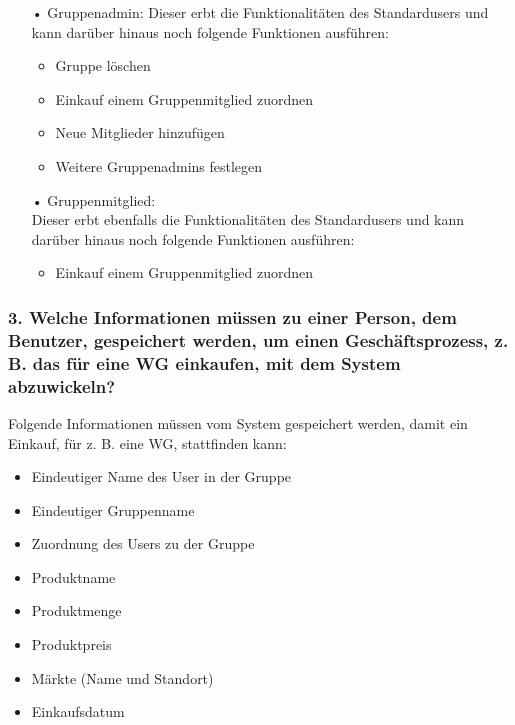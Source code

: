 \documentclass[12pt,a4paper]{article}
\begin{document}
\begin{itemize}
\item[•]Gruppenadmin:
\newline
Dieser erbt die Funktionalitäten des Standardusers und kann darüber hinaus noch folgende Funktionen ausführen:
\begin{itemize}
\item Gruppe löschen
\item Einkauf einem Gruppenmitglied zuordnen
\item Neue Mitglieder hinzufügen
\item Weitere Gruppenadmins festlegen
\end{itemize}
\end{itemize}

\begin{itemize}
\item[•] Gruppenmitglied:
\\
Dieser erbt ebenfalls die Funktionalitäten des Standardusers und kann darüber hinaus noch folgende Funktionen ausführen:
\begin{itemize}
\item Einkauf einem Gruppenmitglied zuordnen
\end{itemize}
\end{itemize}

\subsubsection*{3. Welche Informationen müssen zu einer Person, dem Benutzer, gespeichert werden, um einen Geschäftsprozess, z. B. das für eine WG einkaufen, mit dem System abzuwickeln?}
Folgende Informationen müssen vom System gespeichert werden, damit ein Einkauf, für z. B. eine WG, stattfinden kann:
\begin{itemize} 
\item Eindeutiger Name des User in der Gruppe %
\item Eindeutiger Gruppenname %
\item Zuordnung des Users zu der Gruppe %
\item Produktname
\item Produktmenge
\item Produktpreis
\item Märkte (Name und Standort)
\item Einkaufsdatum
\end{itemize}
 
\end{document}
